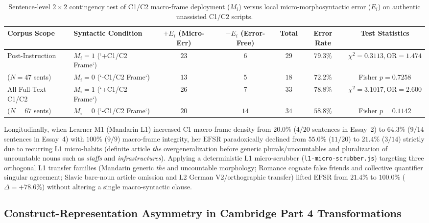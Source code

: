 \documentclass[11pt,reqno]{article}
\begin{document}
\begin{table}[ht]
\centering
\caption{Sentence-level $2\times 2$ contingency test of C1/C2 macro-frame deployment ($M_i$) versus local micro-morphosyntactic error ($E_i$) on authentic unassisted C1/C2 scripts.}\label{tab:contingency}
\smallskip
\begin{tabular}{@{}llccccc@{}}
\toprule
Corpus Scope & Syntactic Condition & $+E_i$ (Micro-Err) & $-E_i$ (Error-Free) & Total & Error Rate & Test Statistics \\
\midrule
Post-Instruction & $M_i = 1$ (`+C1/C2 Frame`) & $23$ & $6$ & $29$ & $79.3\%$ & $\chi^2 = 0.3113, \mathrm{OR} = 1.474$ \\
($N = 47$ sents) & $M_i = 0$ (`-C1/C2 Frame`) & $13$ & $5$ & $18$ & $72.2\%$ & Fisher $p = 0.7258$ \\
\midrule
All Full-Text C1/C2 & $M_i = 1$ (`+C1/C2 Frame`) & $26$ & $7$ & $33$ & $78.8\%$ & $\chi^2 = 3.1017, \mathrm{OR} = 2.600$ \\
($N = 67$ sents) & $M_i = 0$ (`-C1/C2 Frame`) & $20$ & $14$ & $34$ & $58.8\%$ & Fisher $p = 0.1142$ \\
\bottomrule
\end{tabular}
\end{table}

Longitudinally, when Learner M1 (Mandarin L1) increased C1 macro-frame density from $20.0\%$ ($4/20$ sentences in Essay~2) to $64.3\%$ ($9/14$ sentences in Essay~4) with $100\%$ ($9/9$) macro-frame integrity, her $\mathrm{EFSR}$ paradoxically declined from $55.0\%$ ($11/20$) to $21.4\%$ ($3/14$) strictly due to recurring L1 micro-habits (definite article \emph{the} overgeneralization before generic plurals/uncountables and pluralization of uncountable nouns such as \emph{staffs} and \emph{infrastructures}). Applying a deterministic L1 micro-scrubber (\texttt{l1-micro-scrubber.js}) targeting three orthogonal L1 transfer families (Mandarin generic \emph{the} and uncountable morphology; Romance cognate false friends and collective quantifier singular agreement; Slavic bare-noun article omission and L2 German V2/orthographic transfer) lifted $\mathrm{EFSR}$ from $21.4\%$ to $100.0\%$ ($\Delta = +78.6\%$) without altering a single macro-syntactic clause.

\subsection{Construct-Representation Asymmetry in Cambridge Part 4 Transformations}
\end{document}
